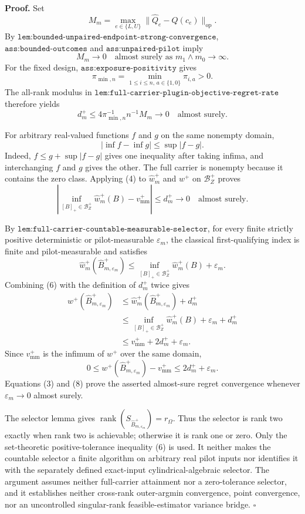 \textbf{Proof.}
Set
\[
M_m=\max_{e\in\{L,U\}}
\lVert\widehat Q_e-Q(c_e)\rVert_{\mathrm{op}}.
\]
By \(\texttt{lem:bounded-unpaired-endpoint-strong-convergence}\), \(\texttt{ass:bounded-outcomes}\) and \(\texttt{ass:unpaired-pilot}\) imply
\[
M_m\longrightarrow0
\quad\text{almost surely as }m_1\wedge m_0\to\infty.
\tag{1}
\]
For the fixed design, \(\texttt{ass:exposure-positivity}\) gives
\[
\pi_{\min,n}=\min_{1\le i\le n,\,a\in\{1,0\}}\pi_{i,a}>0.
\tag{2}
\]
The all-rank modulus in \(\texttt{lem:full-carrier-plugin-objective-regret-rate}\) therefore yields
\[
d_m^+
\le4\pi_{\min,n}^{-1}n^{-1}M_m
\longrightarrow0
\quad\text{almost surely}.
\tag{3}
\]

For arbitrary real-valued functions \(f\) and \(g\) on the same nonempty domain,
\[
|\inf f-\inf g|\le\sup|f-g|.
\tag{4}
\]
Indeed, \(f\le g+\sup|f-g|\) gives one inequality after taking infima, and interchanging \(f\) and \(g\) gives the other.  The full carrier is nonempty because it contains the zero class.  Applying (4) to \(\widehat w_m^+\) and \(w^+\) on \(\mathcal B_Z^+\) proves
\[
\left|
\inf_{[B]_+\in\mathcal B_Z^+}\widehat w_m^+(B)
-v_{\mathrm{mm}}^+
\right|
\le d_m^+\longrightarrow0
\quad\text{almost surely}.
\tag{5}
\]

By \(\texttt{lem:full-carrier-countable-measurable-selector}\), for every finite strictly positive deterministic or pilot-measurable \(\varepsilon_m\), the classical first-qualifying index is finite and pilot-measurable and satisfies
\[
\widehat w_m^+(\widehat B_{m,\varepsilon_m}^+)
\le
\inf_{[B]_+\in\mathcal B_Z^+}\widehat w_m^+(B)+\varepsilon_m.
\tag{6}
\]
Combining (6) with the definition of \(d_m^+\) twice gives
\[
\begin{aligned}
w^+(\widehat B_{m,\varepsilon_m}^+)
&\le\widehat w_m^+(\widehat B_{m,\varepsilon_m}^+)+d_m^+\\
&\le\inf_{[B]_+\in\mathcal B_Z^+}\widehat w_m^+(B)
+\varepsilon_m+d_m^+\\
&\le v_{\mathrm{mm}}^++2d_m^++\varepsilon_m.
\end{aligned}
\tag{7}
\]
Since \(v_{\mathrm{mm}}^+\) is the infimum of \(w^+\) over the same domain,
\[
0\le
w^+(\widehat B_{m,\varepsilon_m}^+)-v_{\mathrm{mm}}^+
\le2d_m^++\varepsilon_m.
\tag{8}
\]
Equations (3) and (8) prove the asserted almost-sure regret convergence whenever \(\varepsilon_m\to0\) almost surely.

The selector lemma gives \(\operatorname{rank}(S_{\widehat B_{m,\varepsilon_m}^+})=r_\Omega\).  Thus the selector is rank two exactly when rank two is achievable; otherwise it is rank one or zero.  Only the set-theoretic positive-tolerance inequality (6) is used.  It neither makes the countable selector a finite algorithm on arbitrary real pilot inputs nor identifies it with the separately defined exact-input cylindrical-algebraic selector.  The argument assumes neither full-carrier attainment nor a zero-tolerance selector, and it establishes neither cross-rank outer-argmin convergence, point convergence, nor an uncontrolled singular-rank feasible-estimator variance bridge. \(\square\)